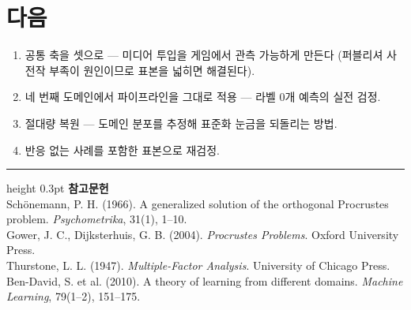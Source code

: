 \documentclass[10pt]{article}
\begin{document}
\section{다음}

\begin{enumerate}[leftmargin=1.3em,itemsep=0.15em]
\item 공통 축을 셋으로 --- 미디어 투입을 게임에서 관측 가능하게 만든다
      (퍼블리셔 사전작 부족이 원인이므로 표본을 넓히면 해결된다).
\item 네 번째 도메인에서 파이프라인을 그대로 적용 --- 라벨 0개 예측의 실전 검정.
\item 절대량 복원 --- 도메인 분포를 추정해 표준화 눈금을 되돌리는 방법.
\item 반응 없는 사례를 포함한 표본으로 재검정.
\end{enumerate}

\vspace{0.6em}
\hrule height 0.3pt
\vspace{0.5em}
{\footnotesize
\textbf{참고문헌}\\[0.3em]
Schönemann, P. H. (1966). A generalized solution of the orthogonal Procrustes
problem. \emph{Psychometrika}, 31(1), 1--10.\\[0.15em]
Gower, J. C., Dijksterhuis, G. B. (2004). \emph{Procrustes Problems}. Oxford
University Press.\\[0.15em]
Thurstone, L. L. (1947). \emph{Multiple-Factor Analysis}. University of Chicago Press.\\[0.15em]
Ben-David, S. et al. (2010). A theory of learning from different domains.
\emph{Machine Learning}, 79(1--2), 151--175.
}
\end{document}

